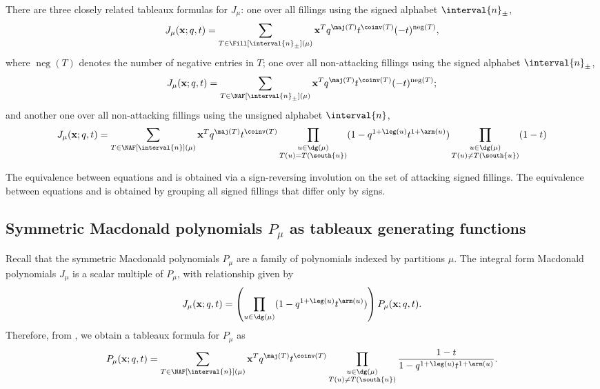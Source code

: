There are three closely related tableaux formulas for \(J_\mu\):
one over all fillings using the signed alphabet \(\interval{n}_\pm\),
\begin{equation} \label{eq:J-Fill-signed}
	J_\mu(\mathbf{x}; q, t)
	= \sum_{T \in \Fill[\interval{n}_\pm](\mu)} \mathbf{x}^T
	q^{\maj(T)}
	t^{\coinv(T)}
	(-t)^{\operatorname{neg}(T)},
\end{equation}
where \(\operatorname{neg}(T)\) denotes the number of negative entries in \(T\);
one over all non-attacking fillings using the signed alphabet \(\interval{n}_\pm\),
\begin{equation} \label{eq:J-NAF-signed}
	J_\mu(\mathbf{x}; q, t)
	= \sum_{T \in \NAF[\interval{n}_\pm](\mu)} \mathbf{x}^T
	q^{\maj(T)}
	t^{\coinv(T)}
	(-t)^{\operatorname{neg}(T)};
\end{equation}
and another one over all non-attacking fillings using the unsigned alphabet \(\interval{n}\),
\begin{equation} \label{eq:J-NAF-unsigned}
	J_\mu(\mathbf{x}; q, t)
	= \sum_{T \in \NAF[\interval{n}](\mu)} \mathbf{x}^T
	q^{\maj(T)} t^{\coinv(T)}
	\prod_{\substack{u \in \dg(\mu) \\ T(u) = T(\south{u})}}
	(1 - q^{1 + \leg(u)} t^{1 + \arm(u)})
	\prod_{\substack{u \in \dg(\mu) \\ T(u) \neq T(\south{u})}}
	(1 - t)
\end{equation}

The equivalence between equations  and  is obtained via a sign-reversing involution on the set of attacking signed fillings.
The equivalence between equations  and  is obtained by grouping all signed fillings that differ only by signs.


\subsection{Symmetric Macdonald polynomials \texorpdfstring{\(P_\mu\)}{Pμ} as tableaux generating functions}

Recall that the symmetric Macdonald polynomials \(P_\mu\) are a family of polynomials indexed by partitions \(\mu\).
The integral form Macdonald polynomials \(J_\mu\) is a scalar multiple of \(P_\mu\), with relationship given by
\begin{equation}
	J_\mu(\mathbf{x}; q, t)
	=
	\left(
		\prod_{u \in \dg(\mu)} (1 - q^{1 + \leg(u)} t^{\arm(u)})
	\right)
	P_\mu(\mathbf{x}; q, t)
	.
\end{equation}
Therefore, from , we obtain a tableaux formula for \(P_\mu\) as
\begin{equation} \label{eq:P-NAF-unsigned}
	P_\mu(\mathbf{x}; q, t)
	= \sum_{T \in \NAF[\interval{n}](\mu)} \mathbf{x}^T
	q^{\maj(T)} t^{\coinv(T)}
	\prod_{\substack{u \in \dg(\mu) \\ T(u) \neq T(\south{u})}}
	\frac{1 - t}{1 - q^{1 + \leg(u)} t^{1 + \arm(u)}}.
\end{equation}

